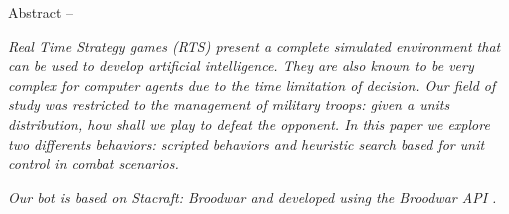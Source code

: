 \begin{bfseries} Abstract -- \end{bfseries}
\emph{Real Time Strategy games (RTS) present a complete simulated environment that can be used to develop artificial intelligence. They are also known to be very complex for computer agents due to the time limitation of decision.
Our field of study was restricted to the management of military troops: given a units distribution, how shall we play to defeat the opponent. In this paper we explore two differents behaviors: scripted behaviors and heuristic search based for unit control in combat scenarios.}

\emph{Our bot is based on Stacraft: Broodwar and developed using the Broodwar API \cite{BWAPI}.}